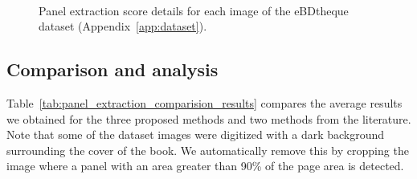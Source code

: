 \begin{figure}[!ht]
  \\
    \caption[Panel extraction score details for each image of the eBDtheque dataset]{Panel extraction score details for each image of the eBDtheque dataset (Appendix~\ref{app:dataset}).}
    \label{fig:ex:panel_detection_result_details}
\end{figure}


\subsection{Comparison and analysis} %
\label{sub:result_analysis}

Table~\ref{tab:panel_extraction_comparision_results} compares the average results we obtained for the three proposed methods and two methods from the literature.
Note that some of the dataset images were digitized with a dark background surrounding the cover of the book.
We automatically remove this by cropping the image where a panel with an area greater than 90\% of the page area is detected.


